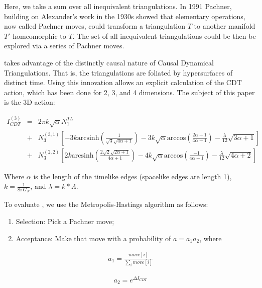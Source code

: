 \documentclass[12pt]{article}
\begin{document}
Here, we take a sum over all inequivalent triangulations. In 1991 Pachner\cite{pachner_p.l._1991}, building on Alexander's work in the 1930s\cite{alexander_combinatorial_1930}
showed that elementary operations, now called Pachner moves, could transform a triangulation $T$ to another manifold $T'$ homeomorphic to $T$. The set of all inequivalent triangulations could be then be explored via a series of Pachner moves.\cite{gross_elementary_1992}

 takes advantage of the distinctly causal nature of Causal Dynamical Triangulations. That is, the triangulations are foliated by hypersurfaces of distinct time.
Using this innovation allows an explicit calculation of the CDT action, which has been done for 2, 3, and 4 dimensions. The subject of this paper is the 3D action:

\begin{eqnarray*}
  I_{CDT}^{(3)} &=& 2\pi k\sqrt{\alpha}N_1^{TL} \\
    &+& N_3^{(3,1)}\left[-3k\text{arcsinh}\left(\frac{1}{\sqrt{3}
    \sqrt{4\alpha +1}}\right)-3k\sqrt{\alpha}\text{arccos}\left(\frac{2\alpha+1}
    {4\alpha+1}\right)-\frac{\lambda}{12}\sqrt{3\alpha+1}\right] \\
    &+& N_3^{(2,2)}\left[2k\text{arcsinh}\left(\frac{2\sqrt{2}\sqrt{2\alpha+1}}
    {4\alpha +1}\right)-4k\sqrt{\alpha}\text{arccos}\left(\frac{-1}{4\alpha+1}
    \right)-\frac{\lambda}{12}\sqrt{4\alpha +2}\right]\label{CDT2}
\end{eqnarray*}

Where $\alpha$ is the length of the timelike edges (spacelike edges are length 1), $k=\frac{1}{8\pi G_{N}}$, and $\lambda=k*\Lambda$.

To evaluate , we use the Metropolis-Hastings algorithm as follows:\\[-4ex]
\begin{enumerate}\addtolength{\itemsep}{-1.5ex}
\item Selection: Pick a Pachner move;  
\item Acceptance: Make that move with a probability of $a=a_1a_2$, where
\end{enumerate}
\vspace*{-1ex}

\begin{align}
  a_{1}=\frac{move[i]}{\sum\limits_{i}move[i]}
\end{align}

\begin{align}
  a_{2}=e^{\Delta I_{CDT}}
\end{align}
\end{document}
